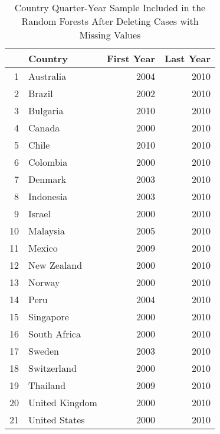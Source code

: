 \begin{table}[ht]
\centering
\caption{Country Quarter-Year Sample Included in the Random Forests After Deleting Cases with Missing Values} 
\begingroup\tiny
\begin{tabular}{rlrr}
  \hline
 & Country & First Year & Last Year \\ 
  \hline
1 & Australia & 2004 & 2010 \\ 
  2 & Brazil & 2002 & 2010 \\ 
  3 & Bulgaria & 2010 & 2010 \\ 
  4 & Canada & 2000 & 2010 \\ 
  5 & Chile & 2010 & 2010 \\ 
  6 & Colombia & 2000 & 2010 \\ 
  7 & Denmark & 2003 & 2010 \\ 
  8 & Indonesia & 2003 & 2010 \\ 
  9 & Israel & 2000 & 2010 \\ 
  10 & Malaysia & 2005 & 2010 \\ 
  11 & Mexico & 2009 & 2010 \\ 
  12 & New Zealand & 2000 & 2010 \\ 
  13 & Norway & 2000 & 2010 \\ 
  14 & Peru & 2004 & 2010 \\ 
  15 & Singapore & 2000 & 2010 \\ 
  16 & South Africa & 2000 & 2010 \\ 
  17 & Sweden & 2003 & 2010 \\ 
  18 & Switzerland & 2000 & 2010 \\ 
  19 & Thailand & 2009 & 2010 \\ 
  20 & United Kingdom & 2000 & 2010 \\ 
  21 & United States & 2000 & 2010 \\ 
   \hline
\end{tabular}
\endgroup
\end{table}
